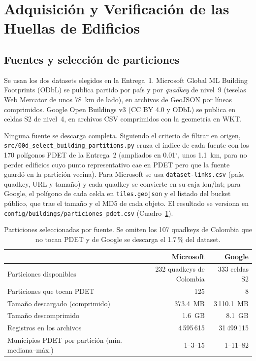
\section{Adquisición y Verificación de las Huellas de Edificios}

\subsection{Fuentes y selección de particiones}
Se usan los dos datasets elegidos en la Entrega~1. Microsoft Global ML Building Footprints (ODbL) se publica partido por país y por \emph{quadkey} de nivel~9 (teselas Web Mercator de unos 78~km de lado), en archivos de GeoJSON por líneas comprimidos. Google Open Buildings v3 (CC BY 4.0 y ODbL) se publica en celdas S2 de nivel~4, en archivos CSV comprimidos con la geometría en WKT.

Ninguna fuente se descarga completa. Siguiendo el criterio de filtrar en origen, \texttt{src/00d\_select\_building\_partitions.py} cruza el índice de cada fuente con los 170 polígonos PDET de la Entrega~2 (ampliados en 0.01$^\circ$, unos 1.1~km, para no perder edificios cuyo punto representativo cae en PDET pero que la fuente guardó en la partición vecina). Para Microsoft se usa \texttt{dataset-links.csv} (país, quadkey, URL y tamaño) y cada quadkey se convierte en su caja lon/lat; para Google, el polígono de cada celda en \texttt{tiles.geojson} y el listado del bucket público, que trae el tamaño y el MD5 de cada objeto. El resultado se versiona en \texttt{config/buildings/particiones\_pdet.csv} (Cuadro~\ref{tab:particiones}).

\begin{table}[H]
\centering
\small
{}
\begin{tabularx}{\textwidth}{X r r}
\toprule
 & \textbf{Microsoft} & \textbf{Google} \\
\midrule
Particiones disponibles & 232 quadkeys de Colombia & 333 celdas S2 \\
Particiones que tocan PDET & 125 & 8 \\
Tamaño descargado (comprimido) & 373.4~MB & 3\,110.1~MB \\
Tamaño descomprimido & 1.6~GB & 8.1~GB \\
Registros en los archivos & 4\,595\,615 & 31\,499\,115 \\
Municipios PDET por partición (mín.--mediana--máx.) & 1--3--15 & 1--11--82 \\
\bottomrule
\end{tabularx}
\caption{Particiones seleccionadas por fuente. Se omiten los 107 quadkeys de Colombia que no tocan PDET y de Google se descarga el 1.7\,\% del dataset.}
\label{tab:particiones}
\end{table}

